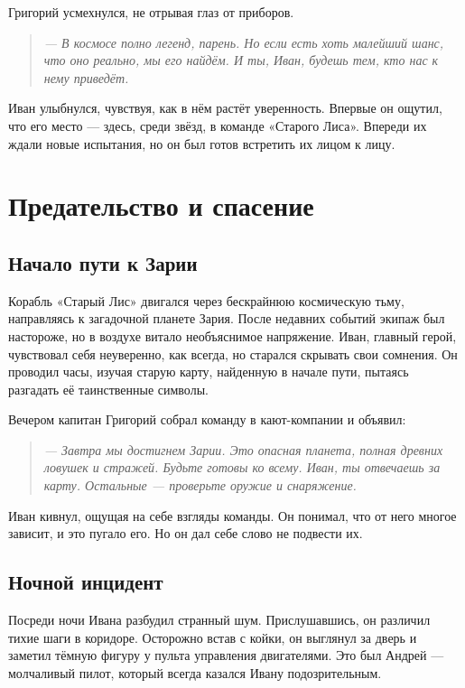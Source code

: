 \documentclass[12pt,a4paper]{book} %
\newenvironment{dialogue}{\begin{quote}\itshape}{\end{quote}}
\begin{document}
Григорий усмехнулся, не отрывая глаз от приборов.

\begin{dialogue}
--- В космосе полно легенд, парень. Но если есть хоть малейший шанс, что оно реально, мы его найдём. И ты, Иван, будешь тем, кто нас к нему приведёт.
\end{dialogue}

Иван улыбнулся, чувствуя, как в нём растёт уверенность. Впервые он ощутил, что его место --- здесь, среди звёзд, в команде «Старого Лиса». Впереди их ждали новые испытания, но он был готов встретить их лицом к лицу.

\chapter{Предательство и спасение}

\section*{Начало пути к Зарии}

Корабль «Старый Лис» двигался через бескрайнюю космическую тьму, направляясь к загадочной планете Зария. После недавних событий экипаж был настороже, но в воздухе витало необъяснимое напряжение. Иван, главный герой, чувствовал себя неуверенно, как всегда, но старался скрывать свои сомнения. Он проводил часы, изучая старую карту, найденную в начале пути, пытаясь разгадать её таинственные символы.

Вечером капитан Григорий собрал команду в кают-компании и объявил:

\begin{dialogue}
--- Завтра мы достигнем Зарии. Это опасная планета, полная древних ловушек и стражей. Будьте готовы ко всему. Иван, ты отвечаешь за карту. Остальные --- проверьте оружие и снаряжение.
\end{dialogue}

Иван кивнул, ощущая на себе взгляды команды. Он понимал, что от него многое зависит, и это пугало его. Но он дал себе слово не подвести их.

\section*{Ночной инцидент}

Посреди ночи Ивана разбудил странный шум. Прислушавшись, он различил тихие шаги в коридоре. Осторожно встав с койки, он выглянул за дверь и заметил тёмную фигуру у пульта управления двигателями. Это был Андрей --- молчаливый пилот, который всегда казался Ивану подозрительным.
\end{document}
